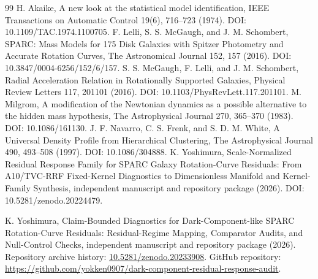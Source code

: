 \documentclass[11pt,a4paper]{article}
\begin{document}
\begin{thebibliography}{99}
 H. Akaike, A new look at the statistical model identification, IEEE Transactions on Automatic Control 19(6), 716--723 (1974). DOI: 10.1109/TAC.1974.1100705.
 F. Lelli, S. S. McGaugh, and J. M. Schombert, SPARC: Mass Models for 175 Disk Galaxies with Spitzer Photometry and Accurate Rotation Curves, The Astronomical Journal 152, 157 (2016). DOI: 10.3847/0004-6256/152/6/157.
 S. S. McGaugh, F. Lelli, and J. M. Schombert, Radial Acceleration Relation in Rotationally Supported Galaxies, Physical Review Letters 117, 201101 (2016). DOI: 10.1103/PhysRevLett.117.201101.
 M. Milgrom, A modification of the Newtonian dynamics as a possible alternative to the hidden mass hypothesis, The Astrophysical Journal 270, 365--370 (1983). DOI: 10.1086/161130.
 J. F. Navarro, C. S. Frenk, and S. D. M. White, A Universal Density Profile from Hierarchical Clustering, The Astrophysical Journal 490, 493--508 (1997). DOI: 10.1086/304888.
 K. Yoshimura, Scale-Normalized Residual Response Family for SPARC Galaxy Rotation-Curve Residuals: From A10/TVC-RRF Fixed-Kernel Diagnostics to Dimensionless Manifold and Kernel-Family Synthesis, independent manuscript and repository package (2026). DOI: 10.5281/zenodo.20224479.

 K. Yoshimura, Claim-Bounded Diagnostics for Dark-Component-like SPARC Rotation-Curve Residuals: Residual-Regime Mapping, Comparator Audits, and Null-Control Checks, independent manuscript and repository package (2026). Repository archive history: \href{https://doi.org/10.5281/zenodo.20233908}{10.5281/zenodo.20233908}. GitHub repository: \url{https://github.com/yokken0907/dark-component-residual-response-audit}.

\end{thebibliography}
\end{document}
